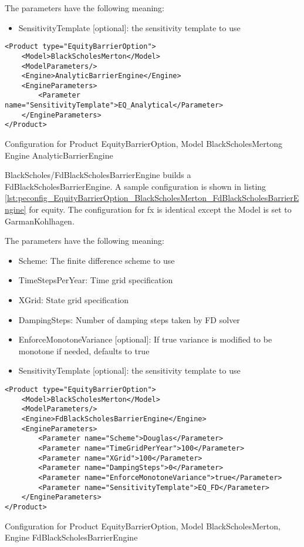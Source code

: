 The parameters have the following meaning:

\begin{itemize}
\item SensitivityTemplate [optional]: the sensitivity template to use 
\end{itemize}

\begin{longlisting}
\begin{verbatim}
<Product type="EquityBarrierOption">
    <Model>BlackScholesMerton</Model>
    <ModelParameters/>
    <Engine>AnalyticBarrierEngine</Engine>
    <EngineParameters>
        <Parameter name="SensitivityTemplate">EQ_Analytical</Parameter>
    </EngineParameters>
</Product>
\end{verbatim}
\caption{Configuration for Product EquityBarrierOption, Model BlackScholesMertong Engine AnalyticBarrierEngine}
\label{lst:peconfig_EquityBarrierOption_BlackScholesMerton_AnalyticBarrierEngine}
\end{longlisting}

BlackScholes/FdBlackScholesBarrierEngine builds a FdBlackScholesBarrierEngine. A sample configuration is shown in
listing \ref{lst:peconfig_EquityBarrierOption_BlackScholesMerton_FdBlackScholesBarrierEngine} for equity. The
configuration for fx is identical except the Model is set to GarmanKohlhagen.

The parameters have the following meaning:

\begin{itemize}
\item Scheme: The finite difference scheme to use
\item TimeStepsPerYear: Time grid specification
\item XGrid: State grid specification
\item DampingSteps: Number of damping steps taken by FD solver
\item EnforceMonotoneVariance [optional]: If true variance is modified to be monotone if needed, defaults to true
\item SensitivityTemplate [optional]: the sensitivity template to use 
\end{itemize}

\begin{longlisting}
\begin{verbatim}
<Product type="EquityBarrierOption">
    <Model>BlackScholesMerton</Model>
    <ModelParameters/>
    <Engine>FdBlackScholesBarrierEngine</Engine>
    <EngineParameters>
        <Parameter name="Scheme">Douglas</Parameter>
        <Parameter name="TimeGridPerYear">100</Parameter>
        <Parameter name="XGrid">100</Parameter>
        <Parameter name="DampingSteps">0</Parameter>
        <Parameter name="EnforceMonotoneVariance">true</Parameter>
        <Parameter name="SensitivityTemplate">EQ_FD</Parameter>
    </EngineParameters>
</Product>
\end{verbatim}
\caption{Configuration for Product EquityBarrierOption, Model BlackScholesMerton, Engine FdBlackScholesBarrierEngine}
\label{lst:peconfig_EquityBarrierOption_BlackScholesMerton_FdBlackScholesBarrierEngine}
\end{longlisting}

